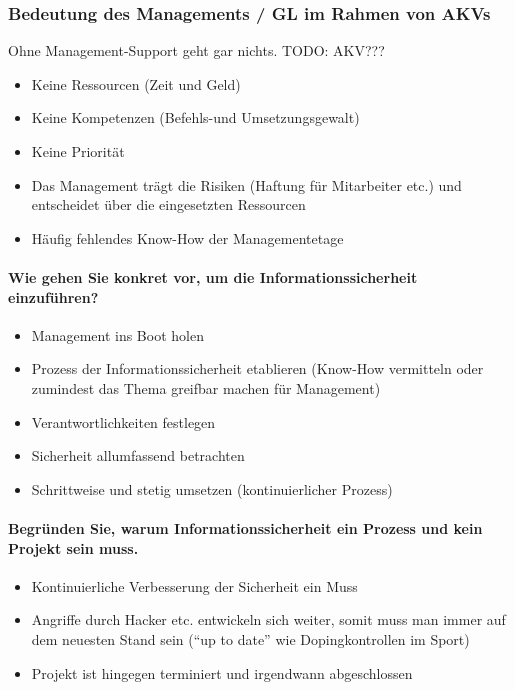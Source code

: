 \documentclass[10pt,a4paper]{article}
\begin{document}
\subsubsection*{Bedeutung des Managements / GL im Rahmen von AKVs}
Ohne Management-Support geht gar nichts. {\color{red}TODO: AKV???}
\begin{itemize}[noitemsep,topsep=0pt,leftmargin=*]
    \item Keine Ressourcen (Zeit und Geld)
    \item Keine Kompetenzen (Befehls-und Umsetzungsgewalt)
    \item Keine Priorität
    \item Das Management trägt die Risiken (Haftung für Mitarbeiter etc.) und entscheidet über die eingesetzten Ressourcen
    \item Häufig fehlendes Know-How der Managementetage
\end{itemize}

\paragraph*{Wie gehen Sie konkret vor, um die Informationssicherheit einzuführen?}
\begin{itemize}[noitemsep,topsep=0pt,leftmargin=*]
    \item Management ins Boot holen
    \item Prozess der Informationssicherheit etablieren (Know-How vermitteln oder zumindest das Thema greifbar machen für Management)
    \item Verantwortlichkeiten festlegen
    \item Sicherheit allumfassend betrachten
    \item Schrittweise und stetig umsetzen (kontinuierlicher Prozess)
\end{itemize}

\paragraph*{Begründen Sie, warum Informationssicherheit ein Prozess und kein Projekt sein muss.}
\begin{itemize}[noitemsep,topsep=0pt,leftmargin=*]
    \item Kontinuierliche Verbesserung der Sicherheit ein Muss
    \item Angriffe durch Hacker etc. entwickeln sich weiter, somit muss man immer auf dem neuesten Stand sein ("`up to date"' wie Dopingkontrollen im Sport)
    \item Projekt ist hingegen terminiert und irgendwann abgeschlossen
\end{itemize}
\end{document}
